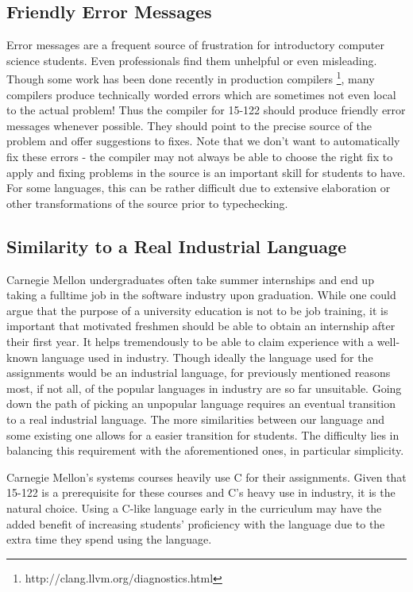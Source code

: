 \subsection{Friendly Error Messages}

Error messages are a frequent source of frustration for introductory computer
science students. Even professionals find them unhelpful or even misleading.
Though some work has been done recently in production compilers
\footnote{http://clang.llvm.org/diagnostics.html}, many compilers produce
technically worded errors which are sometimes not even local to the actual
problem! Thus the compiler for 15-122 should produce friendly error messages
whenever possible. They should point to the precise source of the problem and
offer suggestions to fixes. Note that we don't want to automatically fix these
errors - the compiler may not always be able to choose the right fix to apply
and fixing problems in the source is an important skill for students to have.
For some languages, this can be rather difficult due to extensive elaboration or
other transformations of the source prior to typechecking.

\subsection{Similarity to a Real Industrial Language}

Carnegie Mellon undergraduates often take summer internships and end up taking a
fulltime job in the software industry upon graduation. While one could argue
that the purpose of a university education is not to be job training, it is
important that motivated freshmen should be able to obtain an internship after
their first year. It helps tremendously to be able to claim experience with a
well-known language used in industry. Though ideally the language used for the
assignments would be an industrial language, for previously mentioned reasons
most, if not all, of the popular languages in industry are so far unsuitable.
Going down the path of picking an unpopular language requires an eventual
transition to a real industrial language. The more similarities between our
language and some existing one allows for a easier transition for students. The
difficulty lies in balancing this requirement with the aforementioned ones, in
particular simplicity.

Carnegie Mellon's systems courses heavily use C for their assignments. Given
that 15-122 is a prerequisite for these courses and C's heavy use in industry,
it is the natural choice. Using a C-like language early in the curriculum may
have the added benefit of increasing students' proficiency with the language due
to the extra time they spend using the language.

